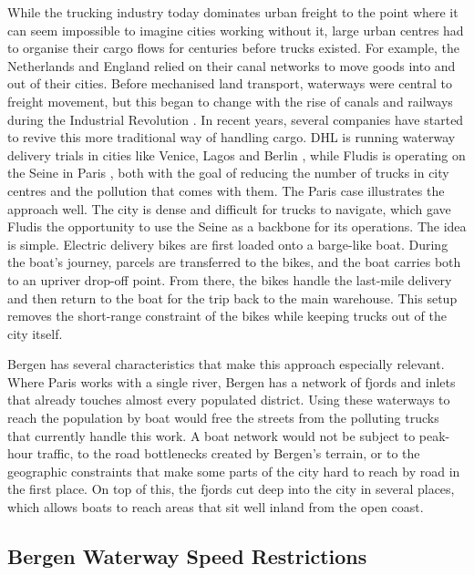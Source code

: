 \documentclass[12pt]{article}
\begin{document}
While the trucking industry today dominates urban freight to the point where it can seem impossible to imagine cities working without it, large urban centres had to organise their cargo flows for centuries before trucks existed. For example, the Netherlands and England relied on their canal networks to move goods into and out of their cities. Before mechanised land transport, waterways were central to freight movement, but this began to change with the rise of canals and railways during the Industrial Revolution \parencite{rodrigue2024emergence}. In recent years, several companies have started to revive this more traditional way of handling cargo. DHL is running waterway delivery trials in cities like Venice, Lagos and Berlin \parencite{dhlboats}, while Fludis is operating on the Seine in Paris \parencite{fludis}, both with the goal of reducing the number of trucks in city centres and the pollution that comes with them. The Paris case illustrates the approach well. The city is dense and difficult for trucks to navigate, which gave Fludis the opportunity to use the Seine as a backbone for its operations. The idea is simple. Electric delivery bikes are first loaded onto a barge-like boat. During the boat's journey, parcels are transferred to the bikes, and the boat carries both to an upriver drop-off point. From there, the bikes handle the last-mile delivery and then return to the boat for the trip back to the main warehouse. This setup removes the short-range constraint of the bikes while keeping trucks out of the city itself.

Bergen has several characteristics that make this approach especially relevant. Where Paris works with a single river, Bergen has a network of fjords and inlets that already touches almost every populated district. Using these waterways to reach the population by boat would free the streets from the polluting trucks that currently handle this work. A boat network would not be subject to peak-hour traffic, to the road bottlenecks created by Bergen's terrain, or to the geographic constraints that make some parts of the city hard to reach by road in the first place. On top of this, the fjords cut deep into the city in several places, which allows boats to reach areas that sit well inland from the open coast.

\clearpage

\subsection{Bergen Waterway Speed Restrictions}
\label{subsec:bergen-waterway-speed-restriction}
\end{document}

